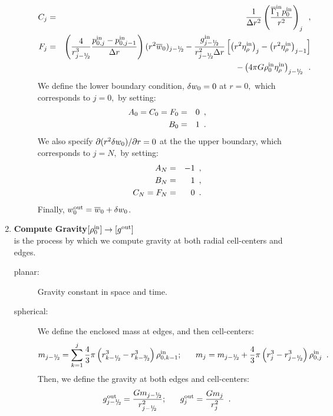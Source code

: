 \begin{enumerate}
\begin{description}
\begin{eqnarray}
C_j &=& \frac{1}{\Delta r^2} \left( \frac{\gammabar^{\inp} p_0^{\inp}}{r^2}\right)_{j}  \enskip, \\
F_j &=&  \left( \frac{4}{r_{j-\myhalf} ^3} \frac{p_{0,j}^{\inp} - p_{0,j-1}^{\inp}}{\dr} \right) (r^2 \ow)_{j-\myhalf}
 - \frac{g_{j-\myhalf}^\inp}{r_{j-\myhalf}^2 \Delta r} 
\left[ \left( r^2 \etarho^{\inp} \right)_{j} - \left( r^2 \etarho^{\inp}  \right)_{j-1} \right] 
\nonumber \\
&& - \left(  4 \pi G \rhozero^{\inp} \etarho^{\inp}   \right)_{j-\myhalf} \enskip .
\end{eqnarray}
We define the lower boundary condition, $ \delta w_0 = 0$ at $r=0,$ which
corresponds to $j=0,$ by setting:
\begin{eqnarray}
A_0 = C_0 = F_0 &=& 0\enskip, \nonumber \\
B_0 &=& 1\enskip.
\end{eqnarray}
We also specify $\partial (r^2 \delta w_0) / \partial r = 0$ at the the upper boundary, which corresponds to $j=N,$
by setting:
\begin{eqnarray}
A_N &=& -1\enskip, \nonumber \\
B_N &=&  1\enskip, \nonumber \\
C_N = F_N &=& 0\enskip.
\end{eqnarray}
Finally, $w_0^{\mathrm{out}} = \overline{w}_0 + \delta w_0$.
\end{description}

\item {\bf Compute Gravity}$[\rho_0^{\mathrm{in}}] \rightarrow [g^{\mathrm{out}}]$\\
is the process by which we compute gravity at both radial cell-centers and edges.
\begin{description}
\item [planar:] Gravity constant in space and time.
\item [spherical:] We define the enclosed mass at edges, and then cell-centers:
\begin{equation}
m_{j-\myhalf} = \sum_{k=1}^j \frac{4}{3}\pi\left(r_{k-\myhalf}^3 - r_{k-\sfrac{3}{2}}^3\right)\rho_{0,k-1}^{\inp}; ~~~~~ m_j = m_{j-\myhalf} + \frac{4}{3}\pi \left(r_j^3 - r_{j-\myhalf}^3\right)\rho_{0,j}^{\inp} \enskip .
\end{equation}
Then, we define the gravity at both edges and cell-centers:
\begin{equation}
g_{j-\myhalf}^\outp = \frac{Gm_{j-\myhalf}}{r_{j-\myhalf}^2}; ~~~~~ 
g_j^\outp = \frac{Gm_j}{r_j^2}\enskip .
\end{equation}
\end{description}

\end{enumerate}

